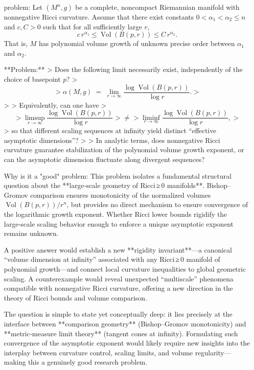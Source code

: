 problem:  
Let \((M^n,g)\) be a complete, noncompact Riemannian manifold with nonnegative Ricci curvature.  
Assume that there exist constants \(0 < \alpha_1 < \alpha_2 \le n\) and \(c, C > 0\) such that for all sufficiently large \(r\),
\[
c\,r^{\alpha_1} \le \operatorname{Vol}(B(p,r)) \le C\,r^{\alpha_2}.
\]
That is, \(M\) has polynomial volume growth of unknown precise order between \(\alpha_1\) and \(\alpha_2\).

**Problem:**  
> Does the following limit necessarily exist, independently of the choice of basepoint \(p\)?
> \[
> \alpha(M,g)\;=\;\lim_{r\to\infty}\frac{\log \operatorname{Vol}(B(p,r))}{\log r}.
> \]
>  
> Equivalently, can one have 
> \[
> \limsup_{r\to\infty}\frac{\log \operatorname{Vol}(B(p,r))}{\log r}
> \neq
> \liminf_{r\to\infty}\frac{\log \operatorname{Vol}(B(p,r))}{\log r},
> \]
> so that different scaling sequences at infinity yield distinct “effective asymptotic dimensions”?  
>  
> In analytic terms, does nonnegative Ricci curvature guarantee stabilization of the polynomial volume growth exponent, or can the asymptotic dimension fluctuate along divergent sequences?

Why is it a "good" problem:  
This problem isolates a fundamental structural question about the **large‑scale geometry of Ricci ≥ 0 manifolds**. Bishop–Gromov comparison ensures monotonicity of the normalized volumes \(\operatorname{Vol}(B(p,r))/r^n\), but provides no direct mechanism to ensure convergence of the logarithmic growth exponent. Whether Ricci lower bounds rigidify the large‑scale scaling behavior enough to enforce a unique asymptotic exponent remains unknown.  

A positive answer would establish a new **rigidity invariant**—a canonical “volume dimension at infinity” associated with any Ricci ≥ 0 manifold of polynomial growth—and connect local curvature inequalities to global geometric scaling. A counterexample would reveal unexpected “multiscale” phenomena compatible with nonnegative Ricci curvature, offering a new direction in the theory of Ricci bounds and volume comparison.  

The question is simple to state yet conceptually deep: it lies precisely at the interface between **comparison geometry** (Bishop–Gromov monotonicity) and **metric‑measure limit theory** (tangent cones at infinity). Formulating such convergence of the asymptotic exponent would likely require new insights into the interplay between curvature control, scaling limits, and volume regularity—making this a genuinely good research problem.
